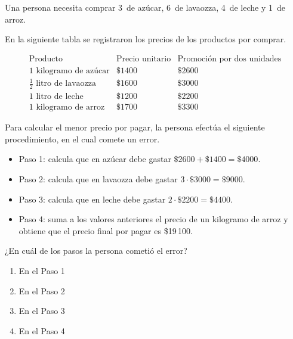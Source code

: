 \begin{problem}
    Una persona necesita comprar 3\, de azúcar, 6\, de lavaozza, 4\, de leche y 1\, de arroz.

    En la siguiente tabla se registraron los precios de los productos por comprar.

    \[
    \begin{array}{c|c|c}
    \text{Producto} & \text{Precio unitario} & \text{Promoción por dos unidades} \\
    \hline
    1 \text{ kilogramo de azúcar} & \$1400 & \$2600 \\
    \frac{1}{2} \text{ litro de lavaozza} & \$1600 & \$3000 \\
    1 \text{ litro de leche} & \$1200 & \$2200 \\
    1 \text{ kilogramo de arroz} & \$1700 & \$3300
    \end{array}
    \]

    Para calcular el menor precio por pagar, la persona efectúa el siguiente procedimiento, en el cual comete un error.

    \begin{itemize}
        \item Paso 1: calcula que en azúcar debe gastar $\$2600 + \$1400 = \$4000$.
        \item Paso 2: calcula que en lavaozza debe gastar $3 \cdot \$3000 = \$9000$.
        \item Paso 3: calcula que en leche debe gastar $2 \cdot \$2200 = \$4400$.
        \item Paso 4: suma a los valores anteriores el precio de un kilogramo de arroz y obtiene que el precio final por pagar es \$19\,100.
    \end{itemize}

    ¿En cuál de los pasos la persona cometió el error?

    \begin{enumerate}[label=\Alph*.]
        \item En el Paso 1
        \item En el Paso 2
        \item En el Paso 3
        \item En el Paso 4
    \end{enumerate}
\end{problem}
